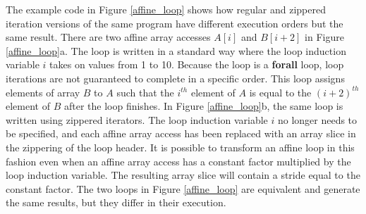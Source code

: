 The example code in Figure \ref{affine_loop} shows how regular and zippered iteration versions of the same program have different execution orders but the same result. There are two affine array accesses $A[i]$ and $B[i+2]$ in Figure \ref{affine_loop}a. The loop is written in a standard way where the loop induction variable $i$ takes on values from 1 to 10. Because the loop is a \textbf{forall} loop, loop iterations are not guaranteed to complete in a specific order. This loop assigns elements of array $B$ to $A$ such that the $i^{th}$ element of $A$ is equal to the $(i+2)^{th}$ element of $B$ after the loop finishes. In Figure \ref{affine_loop}b, the same loop is written using zippered iterators. The loop induction variable $i$ no longer needs to be specified, and each affine array access has been replaced with an array slice in the zippering of the loop header. It is possible to transform an affine loop in this fashion even when an affine array access has a constant factor multiplied by the loop induction variable. The resulting array slice will contain a stride equal to the constant factor. The two loops in Figure \ref{affine_loop} are equivalent and generate the same results, but they differ in their execution.

